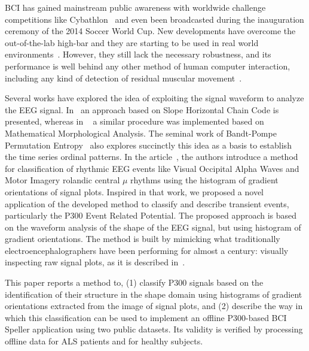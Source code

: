 \documentclass[entropy,article,submit,moreauthors,pdftex,10pt,a4paper]{mdpi}
\begin{document}

BCI has gained mainstream public awareness with worldwide challenge competitions like Cybathlon~\citep{Riener2014} and even been broadcasted during the inauguration ceremony of the 2014 Soccer World Cup.  New developments have overcome the out-of-the-lab high-bar and they are starting to be used in real world environments~\citep{Huggins2016}.  However, they still lack the necessary robustness, and its performance is well behind any other method of human computer interaction, including any kind of detection of residual muscular movement~\citep{Clerc}.

Several works have explored the idea of exploiting the signal waveform to analyze the EEG signal.  In~\citep{Alvarado-Gonzalez2016} an approach based on Slope Horizontal Chain Code is presented, whereas in ~\citep{Yamaguchi2009} a similar procedure was implemented based on Mathematical Morphological Analysis.  The seminal work of Bandt-Pompe Permutation Entropy~\citep{Berger2017} also explores succinctly this idea as a basis to establish the time series ordinal patterns.  In the article~\citep{Ramele2016},  the authors introduce a method for classification of rhythmic EEG events like Visual Occipital Alpha Waves  and Motor Imagery rolandic central $\mu$ rhythms using the histogram of gradient orientations of signal plots.  Inspired in that work, we proposed a novel application of the developed method to classify and describe transient events, particularly the P300 Event Related Potential.  
The proposed approach is based on the waveform analysis of the shape of the EEG signal, but using histogram of gradient orientations. The method is built by mimicking what traditionally electroencephalographers have been performing for almost a century: visually inspecting raw signal plots, as it is described in~\citep{Hartman2005}.

This paper reports a method to, (1) classify P300 signals based on the identification of their structure in the shape domain using histograms of gradient orientations extracted from the image of signal plots, and (2) describe the way in which this classification can be used to implement an offline P300-based BCI Speller application using two public datasets. Its validity is verified by processing offline data for ALS patients and for healthy subjects. 
\end{document}
